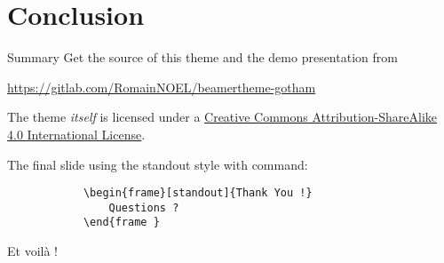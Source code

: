 \documentclass[aspectratio=169]{beamer}
\begin{document}
\section{Conclusion}

   \begin{frame}{Summary}
      Get the source of this theme and the demo presentation from

      \begin{center}\url{https://gitlab.com/RomainNOEL/beamertheme-gotham}\end{center}

      The theme \emph{itself} is licensed under a \href{http://creativecommons.org/licenses/by-sa/4.0/}{Creative Commons Attribution-ShareAlike 4.0 International License}.
      \begin{center} \ccbysa \end{center}
   \end{frame}

   \begin{standoutenv}
   \begin{frame}
      The final slide using the standout style with command:
		\begin{verbatim}
			\begin{frame}[standout]{Thank You !}
	     		Questions ?
		 	\end{frame }
		\end{verbatim}

		\begin{center}
			Et voilà !
		\end{center}
   \end{frame}
   \end{standoutenv}
	
\end{document}
